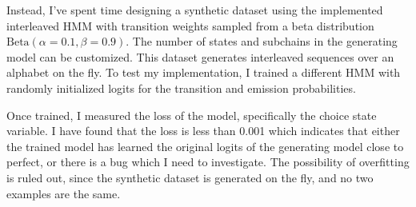 Instead, I've spent time designing a synthetic dataset using the implemented
interleaved HMM with transition weights sampled from a beta distribution
\(\text{Beta}(\alpha=0.1, \beta=0.9)\).  The number of states and subchains in
the generating model can be customized. This dataset generates interleaved
sequences over an alphabet on the fly. To test my implementation, I trained a
different HMM with randomly initialized logits for the transition and emission
probabilities.

Once trained, I measured the loss of the model, specifically the choice state
variable. I have found that the loss is less than 0.001 which indicates that
either the trained model has learned the original logits of the generating model
close to perfect, or there is a bug which I need to investigate. The possibility
of overfitting is ruled out, since the synthetic dataset is generated on the
fly, and no two examples are the same.

\printbibliography

